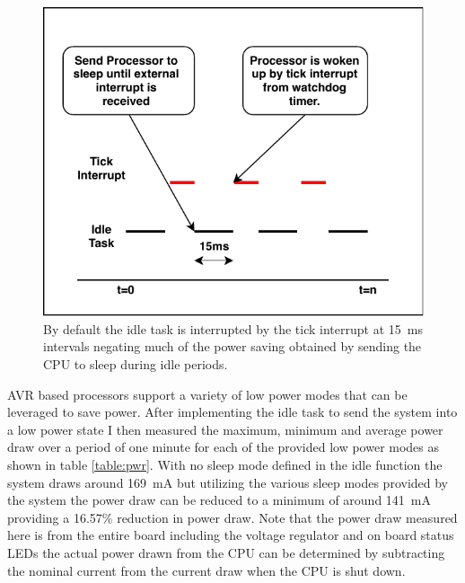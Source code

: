 \documentclass{article}
\begin{document}
    \begin{figure}[H]
\centering
        \includegraphics[scale=.75]{PreemptionDiagram.pdf}
    \caption{By default the idle task is interrupted by the tick interrupt at \SI{15}{\milli\second} intervals negating much of the power saving obtained by sending the CPU to sleep during idle periods.}
    \label{idleint}
\end{figure}



AVR based processors support a variety of low power modes that can be leveraged to save power. After implementing the idle task to send the system into a low power state I then measured the maximum, minimum and average power draw over a period of one minute for each of the provided low power modes as shown in table \ref{table:pwr}. With no sleep mode defined in the idle function the system draws around \SI{169}{\milli\ampere} but utilizing the various sleep modes provided by the system the power draw can be reduced to a minimum of around \SI{141}{\milli\ampere} providing a 16.57\% reduction in power draw. Note that the power draw measured here is from the entire board including the voltage regulator and on board status LEDs the actual power drawn from the CPU can be determined by subtracting the nominal current from the current draw when the CPU is shut down.
    
\end{document}
